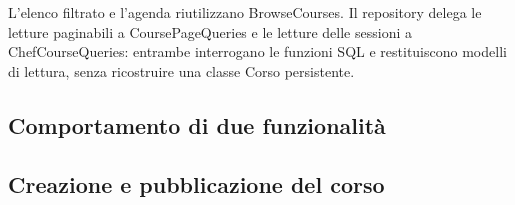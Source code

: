 \documentclass[11pt,a4paper]{article}
\begin{document}
\begin{landscape}
\begin{center}
\label{fig:design-chef-consultation}
\end{center}
{\small L’elenco filtrato e l’agenda riutilizzano BrowseCourses. Il repository delega le letture paginabili a CoursePageQueries e le letture delle sessioni a ChefCourseQueries: entrambe interrogano le funzioni SQL e restituiscono modelli di lettura, senza ricostruire una classe Corso persistente.}
\end{landscape}

\clearpage\begin{landscape}

\section{Comportamento di due funzionalità}

\subsection{Creazione e pubblicazione del corso}\begin{center}


\end{center}
\end{landscape}
\end{document}
